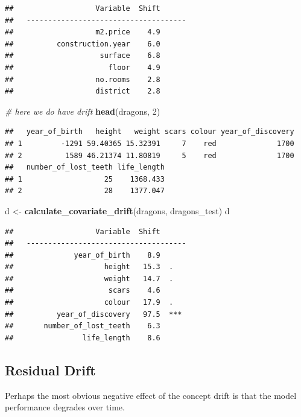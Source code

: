\documentclass[]{krantz}
\newenvironment{Shaded}{\begin{snugshade}}{\end{snugshade}}
\newcommand{\CommentTok}[1]{\textcolor[rgb]{0.56,0.35,0.01}{\textit{#1}}}
\newcommand{\DecValTok}[1]{\textcolor[rgb]{0.00,0.00,0.81}{#1}}
\newcommand{\KeywordTok}[1]{\textcolor[rgb]{0.13,0.29,0.53}{\textbf{#1}}}
\newcommand{\NormalTok}[1]{#1}
\newcommand{\StringTok}[1]{\textcolor[rgb]{0.31,0.60,0.02}{#1}}
\theoremstyle{definition}
\theoremstyle{definition}
\theoremstyle{definition}
\theoremstyle{remark}
\begin{document}
\begin{verbatim}
##                   Variable  Shift
##   -------------------------------------
##                   m2.price    4.9  
##          construction.year    6.0  
##                    surface    6.8  
##                      floor    4.9  
##                   no.rooms    2.8  
##                   district    2.8
\end{verbatim}

\begin{Shaded}
\begin{Highlighting}[]
\CommentTok{# here we do have drift}
\KeywordTok{head}\NormalTok{(dragons, }\DecValTok{2}\NormalTok{)}
\end{Highlighting}
\end{Shaded}

\begin{verbatim}
##   year_of_birth   height   weight scars colour year_of_discovery
## 1         -1291 59.40365 15.32391     7    red              1700
## 2          1589 46.21374 11.80819     5    red              1700
##   number_of_lost_teeth life_length
## 1                   25    1368.433
## 2                   28    1377.047
\end{verbatim}

\begin{Shaded}
\begin{Highlighting}[]
\NormalTok{d <-}\StringTok{ }\KeywordTok{calculate_covariate_drift}\NormalTok{(dragons, dragons_test)}
\NormalTok{d}
\end{Highlighting}
\end{Shaded}

\begin{verbatim}
##                   Variable  Shift
##   -------------------------------------
##              year_of_birth    8.9  
##                     height   15.3  .
##                     weight   14.7  .
##                      scars    4.6  
##                     colour   17.9  .
##          year_of_discovery   97.5  ***
##       number_of_lost_teeth    6.3  
##                life_length    8.6
\end{verbatim}

\hypertarget{residual-drift}{%
\subsection{Residual Drift}\label{residual-drift}}

Perhaps the most obvious negative effect of the concept drift is that
the model performance degrades over time.
\end{document}
